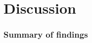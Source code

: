 \part{Discussion}
\label{part:disc}
\vspace*{3cm}
\section{Summary of findings}
\Blindtext[1]
\vfill